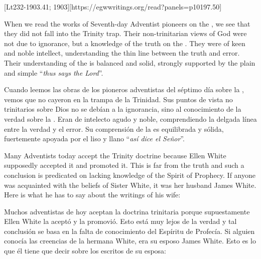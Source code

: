 [Lt232-1903.41; 1903][https://egwwritings.org/read?panels=p10197.50]


When we read the works of Seventh-day Adventist pioneers on the , we see that they did not fall into the Trinity trap. Their non-trinitarian views of God were not due to ignorance, but a knowledge of the truth on the . They were of keen and noble intellect, understanding the thin line between the truth and error. Their understanding of the  is balanced and solid, strongly supported by the plain and simple “\textit{thus says the Lord}”.


Cuando leemos las obras de los pioneros adventistas del séptimo día sobre la , vemos que no cayeron en la trampa de la Trinidad. Sus puntos de vista no trinitarios sobre Dios no se debían a la ignorancia, sino al conocimiento de la verdad sobre la . Eran de intelecto agudo y noble, comprendiendo la delgada línea entre la verdad y el error. Su comprensión de la  es equilibrada y sólida, fuertemente apoyada por el liso y llano “\textit{así dice el Señor}”.


Many Adventists today accept the Trinity doctrine because Ellen White supposedly accepted it and promoted it. This is far from the truth and such a conclusion is predicated on lacking knowledge of the Spirit of Prophecy. If anyone was acquainted with the beliefs of Sister White, it was her husband James White. Here is what he has to say about the writings of his wife:


Muchos adventistas de hoy aceptan la doctrina trinitaria porque supuestamente Ellen White la aceptó y la promovió. Esto está muy lejos de la verdad y tal conclusión se basa en la falta de conocimiento del Espíritu de Profecía. Si alguien conocía las creencias de la hermana White, era su esposo James White. Esto es lo que él tiene que decir sobre los escritos de su esposa:


